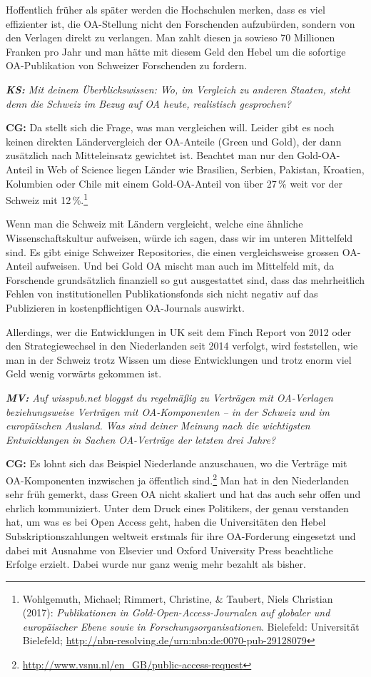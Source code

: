 \documentclass[a4paper,
fontsize=11pt,
oneside,
numbers=noperiodatend,
parskip=half-,
bibliography=totoc,
final
]{scrartcl}
\begin{document}
Hoffentlich früher als später werden die Hochschulen merken, dass es
viel effizienter ist, die OA-Stellung nicht den Forschenden aufzubürden,
sondern von den Verlagen direkt zu verlangen. Man zahlt diesen ja
sowieso 70 Millionen Franken pro Jahr und man hätte mit diesem Geld den
Hebel um die sofortige OA-Publikation von Schweizer Forschenden zu
fordern.

\emph{\textbf{KS:} Mit deinem Überblickswissen: Wo, im Vergleich zu
anderen Staaten, steht denn die Schweiz im Bezug auf OA heute,
realistisch gesprochen?}

\textbf{CG:} Da stellt sich die Frage, was man vergleichen will. Leider
gibt es noch keinen direkten Ländervergleich der OA-Anteile (Green und
Gold), der dann zusätzlich nach Mitteleinsatz gewichtet ist. Beachtet
man nur den Gold-OA-Anteil in Web of Science liegen Länder wie
Brasilien, Serbien, Pakistan, Kroatien, Kolumbien oder Chile mit einem
Gold-OA-Anteil von über 27\,\% weit vor der Schweiz mit
12\,\%.\footnote{Wohlgemuth, Michael; Rimmert, Christine, \& Taubert,
  Niels Christian (2017): \emph{Publikationen in
  Gold-Open-Access-Journalen auf globaler und europäischer Ebene sowie
  in Forschungsorganisationen}. Bielefeld: Universität Bielefeld;
  \url{http://nbn-resolving.de/urn:nbn:de:0070-pub-29128079}}

Wenn man die Schweiz mit Ländern vergleicht, welche eine ähnliche
Wissenschaftskultur aufweisen, würde ich sagen, dass wir im unteren
Mittelfeld sind. Es gibt einige Schweizer Repositories, die einen
vergleichsweise grossen OA-Anteil aufweisen. Und bei Gold OA mischt man
auch im Mittelfeld mit, da Forschende grundsätzlich finanziell so gut
ausgestattet sind, dass das mehrheitlich Fehlen von institutionellen
Publikationsfonds sich nicht negativ auf das Publizieren in
kostenpflichtigen OA-Journals auswirkt.

Allerdings, wer die Entwicklungen in UK seit dem Finch Report von 2012
oder den Strategiewechsel in den Niederlanden seit 2014 verfolgt, wird
feststellen, wie man in der Schweiz trotz Wissen um diese Entwicklungen
und trotz enorm viel Geld wenig vorwärts gekommen ist.

\emph{\textbf{MV:} Auf wisspub.net bloggst du regelmäßig zu Verträgen
mit OA-Verlagen beziehungsweise Verträgen mit OA-Komponenten -- in der
Schweiz und im europäischen Ausland. Was sind deiner Meinung nach die
wichtigsten Entwicklungen in Sachen OA-Verträge der letzten drei Jahre?}

\textbf{CG:} Es lohnt sich das Beispiel Niederlande anzuschauen, wo die
Verträge mit OA-Komponenten inzwischen ja öffentlich sind.\footnote{\url{http://www.vsnu.nl/en_GB/public-access-request}}
Man hat in den Niederlanden sehr früh gemerkt, dass Green OA nicht
skaliert und hat das auch sehr offen und ehrlich kommuniziert. Unter dem
Druck eines Politikers, der genau verstanden hat, um was es bei Open
Access geht, haben die Universitäten den Hebel Subskriptionszahlungen
weltweit erstmals für ihre OA-Forderung eingesetzt und dabei mit
Ausnahme von Elsevier und Oxford University Press beachtliche Erfolge
erzielt. Dabei wurde nur ganz wenig mehr bezahlt als bisher.
\end{document}
